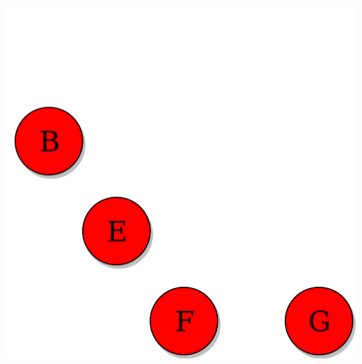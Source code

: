 \documentclass{article}
\begin{document}
\begin{center}
\includegraphics[scale=0.2]{tree_coloured.png}
\end{center}
\end{document}
